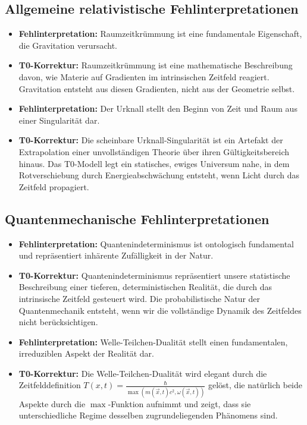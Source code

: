 \documentclass[12pt,a4paper]{article}
\newcommand{\Tfieldt}{T(x,t)}
\newcommand{\vecx}{\vec{x}}
\begin{document}
	\subsection{Allgemeine relativistische Fehlinterpretationen}
	\label{subsec:gr_misinterpretations}
	
	\begin{itemize}
		\item \textbf{Fehlinterpretation:} Raumzeitkrümmung ist eine fundamentale Eigenschaft, die Gravitation verursacht.
		\item \textbf{T0-Korrektur:} Raumzeitkrümmung ist eine mathematische Beschreibung davon, wie Materie auf Gradienten im intrinsischen Zeitfeld reagiert. Gravitation entsteht aus diesen Gradienten, nicht aus der Geometrie selbst.
		
		\item \textbf{Fehlinterpretation:} Der Urknall stellt den Beginn von Zeit und Raum aus einer Singularität dar.
		\item \textbf{T0-Korrektur:} Die scheinbare Urknall-Singularität ist ein Artefakt der Extrapolation einer unvollständigen Theorie über ihren Gültigkeitsbereich hinaus. Das T0-Modell legt ein statisches, ewiges Universum nahe, in dem Rotverschiebung durch Energieabschwächung entsteht, wenn Licht durch das Zeitfeld propagiert.
	\end{itemize}
	
	\subsection{Quantenmechanische Fehlinterpretationen}
	\label{subsec:qm_misinterpretations}
	
	\begin{itemize}
		\item \textbf{Fehlinterpretation:} Quantenindeterminismus ist ontologisch fundamental und repräsentiert inhärente Zufälligkeit in der Natur.
		\item \textbf{T0-Korrektur:} Quantenindeterminismus repräsentiert unsere statistische Beschreibung einer tieferen, deterministischen Realität, die durch das intrinsische Zeitfeld gesteuert wird. Die probabilistische Natur der Quantenmechanik entsteht, wenn wir die vollständige Dynamik des Zeitfeldes nicht berücksichtigen.
		
		\item \textbf{Fehlinterpretation:} Welle-Teilchen-Dualität stellt einen fundamentalen, irreduziblen Aspekt der Realität dar.
		\item \textbf{T0-Korrektur:} Die Welle-Teilchen-Dualität wird elegant durch die Zeitfelddefinition $\Tfieldt = \frac{\hbar}{\max(m(\vecx,t)c^2, \omega(\vecx,t))}$ gelöst, die natürlich beide Aspekte durch die $\max$-Funktion aufnimmt und zeigt, dass sie unterschiedliche Regime desselben zugrundeliegenden Phänomens sind.
	\end{itemize}
	
\end{document}
